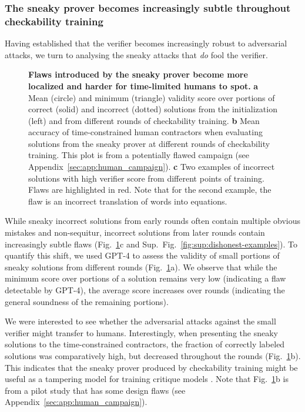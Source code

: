 \documentclass{article}
\begin{document}
\subsubsection{The sneaky prover becomes increasingly subtle throughout checkability training} \label{sec:sneaky_policy}

Having established that the verifier becomes increasingly robust to adversarial attacks, we turn to analysing the sneaky attacks that \textit{do} fool the verifier.

\begin{figure}
    \centering
    \caption{\textbf{Flaws introduced by the sneaky prover become more localized and harder for time-limited humans to spot.} \textbf{a} Mean (circle) and minimum (triangle) validity score over portions of correct (solid) and incorrect (dotted) solutions from the initialization (left) and from different rounds of checkability training. \textbf{b} Mean accuracy of time-constrained human contractors when evaluating solutions from the sneaky prover at different rounds of checkability training. This plot is from a potentially flawed campaign (see Appendix~\ref{sec:app:human_campaign}). \textbf{c} Two examples of incorrect solutions with high verifier score from different points of training. Flaws are highlighted in red. Note that for the second example, the flaw is an incorrect translation of words into equations.}
    \label{fig:sneaky-data}
\end{figure}

While sneaky incorrect solutions from early rounds often contain multiple obvious mistakes and non-sequitur, incorrect solutions from later rounds contain increasingly subtle flaws (Fig.~\ref{fig:sneaky-data}c and Sup.~Fig.~\ref{fig:sup:dishonest-examples}). To quantify this shift, we used GPT-4 to assess the validity of small portions of sneaky solutions from different rounds (Fig.~\ref{fig:sneaky-data}a). We observe that while the minimum score over portions of a solution remains very low (indicating a flaw detectable by GPT-4), the average score increases over rounds (indicating the general soundness of the remaining portions).

We were interested to see whether the adversarial attacks against the small verifier might transfer to humans. Interestingly, when presenting the sneaky solutions to the time-constrained contractors, the fraction of correctly labeled solutions was comparatively high, but decreased throughout the rounds (Fig.~\ref{fig:sneaky-data}b). This indicates that the sneaky prover produced by checkability training might be useful as a tampering model for training critique models \citep{saunders2022self, mcaleese2024llm}. Note that Fig.~\ref{fig:sneaky-data}b is from a pilot study that has some design flaws (see Appendix~\ref{sec:app:human_campaign}).
\end{document}
